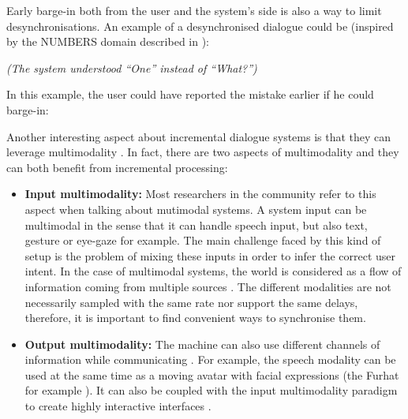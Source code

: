                   Early barge-in both from the user and the system's side is also a way to limit desynchronisations. An example of a desynchronised dialogue could be (inspired by the NUMBERS domain described in \cite{Skantze2009}):
                  
                  \begin{dialogue}
                     \textit{(The system understood ``One'' instead of ``What?'')}
                    \end{dialogue}
                    
                    In this example, the user could have reported the mistake earlier if he could barge-in:
                    
                    \begin{dialogue}
                      \end{dialogue}
                      
                      Another interesting aspect about incremental dialogue systems is that they can leverage multimodality \cite{Fink1998}. In fact, there are two aspects of multimodality and they can both benefit from incremental processing:
                      
                      \begin{itemize}
                           \item \textbf{Input multimodality:} Most researchers in the community refer to this aspect when talking about mutimodal systems. A system input can be multimodal in the sense that it can handle speech input, but also text, gesture or eye-gaze for example. The main challenge faced by this kind of setup is the problem of mixing these inputs in order to infer the correct user intent. In the case of multimodal systems, the world is considered as a flow of information coming from multiple sources \cite{Chao2012,Rosenthal2013}. The different modalities are not necessarily sampled with the same rate nor support the same delays, therefore, it is important to find convenient ways to synchronise them.
                                \item \textbf{Output multimodality:} The machine can also use different channels of information while communicating \cite{Matthias2009}. For example, the speech modality can be used at the same time as a moving avatar with facial expressions (the Furhat for example \cite{Skantze2015}). It can also be coupled with the input multimodality paradigm to create highly interactive interfaces \cite{Johnston2014}.
                                  \end{itemize}
                                  

